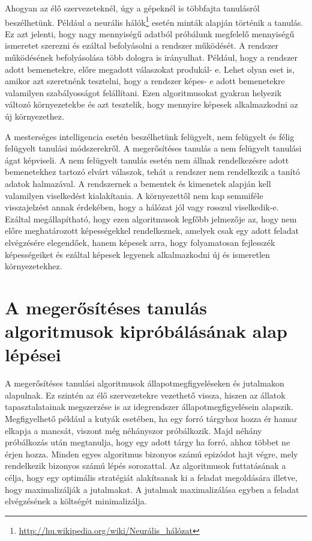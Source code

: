 	 Ahogyan az élő szervezeteknél, úgy a gépeknél is többfajta tanulásról beszélhetünk. Például a neurális hálók\footnote{\href {http://hu.wikipedia.org/wiki/Neurális\_hálózat}{http://hu.wikipedia.org/wiki/Neurális\_hálózat}} esetén minták alapján történik a tanulás. Ez azt jelenti, hogy nagy mennyiségű adatból próbálunk megfelelő mennyiségű ismeretet szerezni és ezáltal befolyásolni a rendszer működését. A rendszer működésének befolyásolása több dologra is irányulhat. Például, hogy a rendszer adott bemenetekre, előre megadott válaszokat produkál- e. Lehet olyan eset is, amikor azt szeretnénk tesztelni, hogy a rendszer képes- e adott bemenetekre valamilyen szabályosságot felállítani. Ezen algoritmusokat gyakran helyezik változó környezetekbe és azt tesztelik, hogy mennyire képesek alkalmazkodni az új környezethez. 	
	
	 A mesterséges intelligencia esetén beszélhetünk felügyelt, nem felügyelt és félig felügyelt tanulási módszerekről. A megerősítéses tanulás a nem felügyelt tanulási ágat képviseli. A nem felügyelt tanulás esetén nem állnak rendelkezésre adott bemenetekhez tartozó elvárt válaszok, tehát a rendszer nem rendelkezik a tanító adatok halmazával. A rendszernek a bementek és kimenetek alapján kell valamilyen viselkedést kialakítania. A környezettől nem kap semmiféle visszajelzést annak érdekében, hogy a hálózat jól vagy rosszul viselkedik-e. Ezáltal megállapítható, hogy ezen algoritmusok legfőbb jelmezője az, hogy nem előre meghatározott képességekkel rendelkeznek, amelyek csak egy adott feladat elvégzésére elegendőek, hanem képesek arra, hogy folyamatosan fejlesszék képességeiket és ezáltal képesek legyenek alkalmazkodni új és ismeretlen környezetekhez.

\section{A megerősítéses tanulás algoritmusok kipróbálásának alap lépései}\label{sec:MEGEROSITESESALOGRITMUSOK}

A megerősítéses tanulási\cite{reinfLearning} algoritmusok állapotmegfigyeléseken és jutalmakon alapulnak. Ez szintén az élő szervezetekre vezethető vissza, hiszen az állatok tapasztalatainak megszerzése is az idegrendszer állapotmegfigyelésein alapszik. Megfigyelhető például a kutyák esetében, ha egy forró tárgyhoz hozza ér hamar elkapja a mancsát, viszont még néhányszor próbálkozik. Majd néhány próbálkozás után megtanulja, hogy egy adott tárgy ha forró, ahhoz többet ne érjen hozza. 
Minden egyes algoritmus bizonyos számú epizódot hajt végre, mely rendelkezik bizonyos számú lépés sorozattal. Az algoritmusok futtatásának a célja, hogy egy optimális stratégiát alakítsanak ki a feladat megoldására illetve, hogy maximalizálják a jutalmakat. A jutalmak maximalizálása egyben a feladat elvégzésének a költségét minimalizálja.\cite{dynamicProg}

